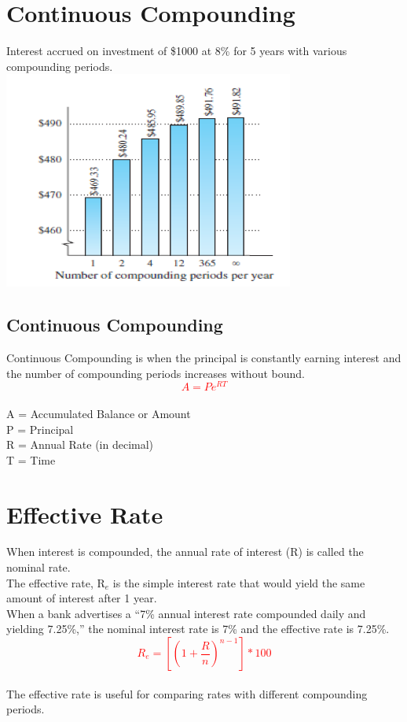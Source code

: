 \documentclass{article}
\begin{document}
	\section{Continuous Compounding}
	Interest accrued on investment of \$1000 at 8\% for 5 years with various compounding periods.\\
	\includegraphics[width=1.0\linewidth]{bar chart.png}
	\newpage
	\subsection{Continuous Compounding}
	Continuous Compounding is when the principal is constantly earning interest and the number of compounding periods increases without bound.
	\textcolor{red}{\begin{equation}
			A=Pe^{RT}
	\end{equation}}\\
	A  =  Accumulated Balance or Amount\\
	P = Principal
\\
	R = Annual Rate (in decimal)
\\
	T = Time
	\newpage
	\section{Effective Rate}
	When interest is compounded, the annual rate of interest (R) is called the nominal rate.\\
	The effective rate, R$_{e}$ is the simple interest rate that would yield the same amount of interest after 1 year.\\
	When a bank advertises a “7\% annual interest rate compounded daily and yielding 7.25\%,” the nominal interest rate is 7\% and the effective rate is 7.25\%. \\
	\textcolor{red}{\begin{equation}
			R_{e} = [(1+\frac{R}{n})^{n-1}]*100
	\end{equation}}\\
	The effective rate is useful for comparing rates with different compounding periods. \\
	\newpage
\end{document}
